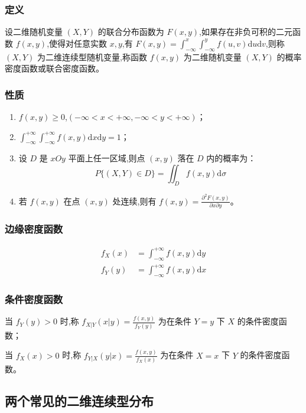 \documentclass[UTF8]{ctexart}
\theoremstyle{remark}
\begin{document}
		\subsubsection{定义}
		设二维随机变量 \((X, Y)\) 的联合分布函数为 \(F(x, y)\),如果存在非负可积的二元函数 \(f(x, y)\),使得对任意实数 \(x, y\),有 \(F(x, y) = \int_{-\infty}^{x} \int_{-\infty}^{y} f(u, v) \mathrm{d}u \mathrm{d}v\),则称 \((X, Y)\) 为二维连续型随机变量,称函数 \(f(x, y)\) 为二维随机变量 \((X, Y)\) 的概率密度函数或联合密度函数。
		
		\subsubsection{性质}
		\begin{enumerate}
			\item \(f(x, y) \geq 0\),\((-\infty < x < +\infty, -\infty < y < +\infty)\)；
			\item \(\int_{-\infty}^{+\infty} \int_{-\infty}^{+\infty} f(x, y) \mathrm{d}x \mathrm{d}y = 1\)；
			\setcounter{enumi}{2}
			\item 设 \(D\) 是 \(xOy\) 平面上任一区域,则点 \((x, y)\) 落在 \(D\) 内的概率为：
			\[
			P\{(X, Y) \in D\} = \iint_{D} f(x, y) \mathrm{d}\sigma
			\]
			\item 若 \(f(x, y)\) 在点 \((x, y)\) 处连续,则有 \(f(x, y) = \frac{\partial^{2} F(x, y)}{\partial x \partial y}\)。
		\end{enumerate}
		
		\subsubsection{边缘密度函数}
		
		\begin{align*}
			f_X(x) &= \int_{-\infty}^{+\infty} f(x, y) \mathrm{d}y\\
			f_Y(y) &= \int_{-\infty}^{+\infty} f(x, y) \mathrm{d}x
		\end{align*}
		
		
		\subsubsection{条件密度函数}
		当 \(f_Y(y) > 0\) 时,称 \(f_{X|Y}(x|y) = \frac{f(x, y)}{f_Y(y)}\) 为在条件 \(Y = y\) 下 \(X\) 的条件密度函数；
		
		当 \(f_X(x) > 0\) 时,称 \(f_{Y|X}(y|x) = \frac{f(x, y)}{f_X(x)}\) 为在条件 \(X = x\) 下 \(Y\) 的条件密度函数。
		
		\subsection{两个常见的二维连续型分布}
\end{document}
